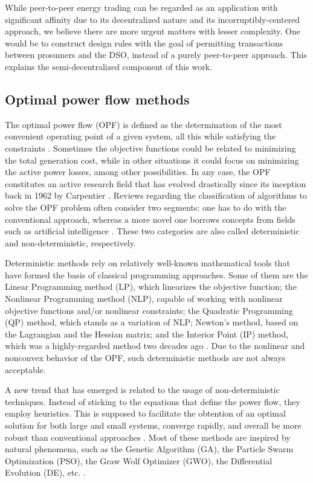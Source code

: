 While peer-to-peer energy trading can be regarded as an application with significant affinity due to its decentralized nature and its incorruptibly-centered approach, we believe there are more urgent matters with lesser complexity. One would be to construct design rules with the goal of permitting transactions between prosumers and the DSO, instead of a purely peer-to-peer approach. This explains the semi-decentralized component of this work.


\subsection{Optimal power flow methods}
The optimal power flow (OPF) is defined as the determination of the most convenient operating point of a given system, all this while satisfying the constraints \cite{neos, ebeed2018optimal}. Sometimes the objective functions could be related to minimizing the total generation cost, while in other situations it could focus on minimizing the active power losses, among other possibilities. In any case, the OPF constitutes an active research field that has evolved drastically since its inception back in 1962 by Carpentier \cite{carpentier1962contribution}. Reviews regarding the classification of algorithms to solve the OPF problem often consider two segments: one has to do with the conventional approach, whereas a more novel one borrows concepts from fields such as artificial intelligence \cite{ebeed2018optimal, frank2012optimal}. These two categories are also called deterministic and non-deterministic, respectively. 

Deterministic methods rely on relatively well-known mathematical tools that have formed the basis of classical programming approaches. Some of them are the Linear Programming method (LP), which linearizes the objective function; the Nonlinear Programming method (NLP), capable of working with nonlinear objective functions and/or nonlinear constraints; the Quadratic Programming (QP) method, which stands as a variation of NLP; Newton's method, based on the Lagrangian and the Hessian matrix; and the Interior Point (IP) method, which was a highly-regarded method two decades ago \cite{momoh1999improved,qiu2009literature}. Due to the nonlinear and nonconvex behavior of the OPF, such deterministic methods are not always acceptable. 

A new trend that has emerged is related to the usage of non-deterministic techniques. Instead of sticking to the equations that define the power flow, they employ heuristics. This is supposed to facilitate the obtention of an optimal solution for both large and small systems, converge rapidly, and overall be more robust than conventional approaches \cite{ebeed2018optimal}. Most of these methods are inspired by natural phenomena, such as the Genetic Algorithm (GA), the Particle Swarm Optimization (PSO), the Graw Wolf Optimizer (GWO), the Differential Evolution (DE), etc. \cite{khamees2016optimal, alrashidi2008survey}.  

